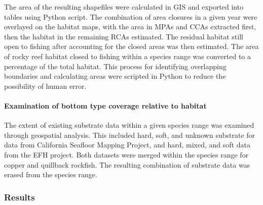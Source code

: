 \documentclass[11pt,
  english,
  letterpaper,
]{article}
\begin{document}

The area of the resulting shapefiles were calculated in GIS and exported into tables using Python script. The combination of area closures in a given year were overlayed on the habitat maps, with the area in MPAs and CCAs extracted first, then the habitat in the remaining RCAs estimated. The residual habitat still open to fishing after accounting for the closed areas was then estimated. The area of rocky reef habitat closed to fishing within a species range was converted to a percentage of the total habitat. This process for identifying overlapping boundaries and calculating areas were scripted in Python to reduce the possibility of human error.

\leavevmode\tagmcend\tagstructend\par


\hypertarget{examination-of-bottom-type-coverage-relative-to-habitat}{%
\paragraph{Examination of bottom type coverage relative to habitat}\label{examination-of-bottom-type-coverage-relative-to-habitat}}

\leavevmode\tagmcend\tagstructend


The extent of existing substrate data within a given species range was examined through geospatial analysis. This included hard, soft, and unknown substrate for data from California Seafloor Mapping Project, and hard, mixed, and soft data from the EFH project. Both datasets were merged within the species range for copper and quillback rockfish. The resulting combination of substrate data was erased from the species range.

\leavevmode\tagmcend\tagstructend\par


\hypertarget{results}{%
\subsubsection{Results}\label{results}}

\leavevmode\tagmcend\tagstructend

\end{document}
